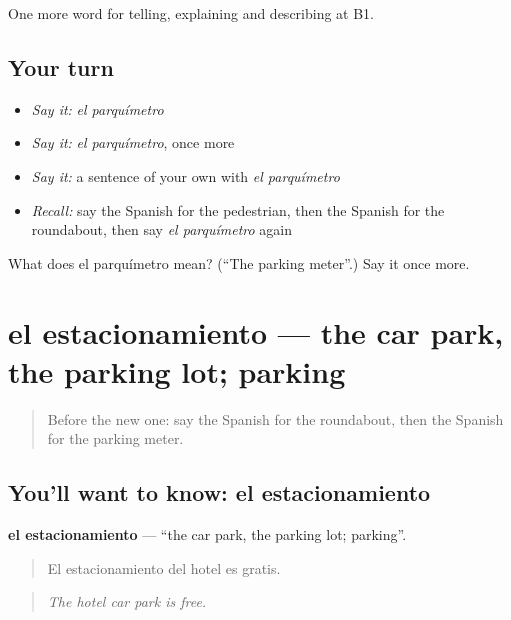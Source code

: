 \begin{grammarlens}[title={What you've built}]
One more word for telling, explaining and describing at B1.
\end{grammarlens}

\subsection*{Your turn}
\begin{itemize}
\raggedright
  \item \emph{Say it:} \emph{el parquímetro}
  \item \emph{Say it:} \emph{el parquímetro}, once more
  \item \emph{Say it:} a sentence of your own with \emph{el parquímetro}
  \item \emph{Recall:} say the Spanish for the pedestrian, then the Spanish for the roundabout, then say \emph{el parquímetro} again
\end{itemize}

\begin{tcolorbox}[breakable,colback=teal!4,colframe=teal!35!black,title={Before you move on}]
What does el parquímetro mean? (\textquotedblleft{}The parking meter\textquotedblright{}.) Say it once more.
\end{tcolorbox}
\section[el estacionamiento]{el estacionamiento — the car park, the parking lot; parking}

\label{lesson:ES-C648-estacionamiento}



\begin{quote}
Before the new one: say the Spanish for the roundabout, then the Spanish for the parking meter.
\end{quote}

\subsection*{You'll want to know: el estacionamiento}
\textbf{el estacionamiento} — \textquotedblleft{}the car park, the parking lot; parking\textquotedblright{}.

\begin{quote}
El estacionamiento del hotel es gratis.
\end{quote}

\begin{quote}
\emph{The hotel car park is free.}
\end{quote}

